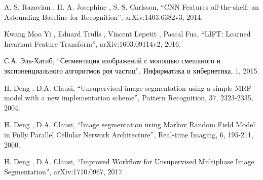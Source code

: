 \documentclass[14pt, a4paper, oneside, bold]{extarticle}
\begin{document}
\begin{thebibliography}{99}
 A. S. Razavian
	, H. A. Josephine
	, S. S. Carlsson,
	``CNN Features off-the-shelf: an Astounding Baseline for Recognition'', 
arXiv:1403.6382v3, 2014.

 Kwang Moo Yi
	, Eduard Trulls
	, Vincent Lepetit
	, Pascal Fua,
	``LIFT: Learned Invariant Feature Transform'', 
arXiv:1603.09114v2, 2016.

 С.А. Эль-Хатиб,
	``Сегментация изображений с мопощью смешаного и экспоненциального алгоритмов роя частиц'', 
Информатика и кибернетика, 1, 2015.

 H. Deng
	, D.A. Clausi, 
	``Unsupervised image segmentation using a simple MRF model with a new implementation scheme'', 
Pattern Recognition, 37, 2323-2335, 2004.

 H. Deng
	, D.A. Clausi, 
	``Image segmentation using Markov Random Field Model in Fully Parallel Cellular Nerwork Architecture'', 
Real-time Imaging, 6, 195-211, 2000.

 H. Deng
	, D.A. Clausi, 
	``Improved Workflow for Unsupervised Multiphase Image Segmentation'', 
arXiv:1710.0967, 2017.

\end{thebibliography}
\end{document}
